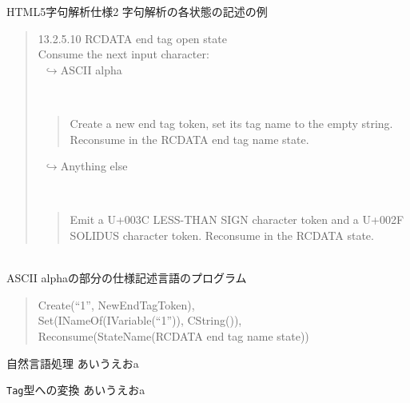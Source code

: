 \documentclass[dvipdfmx]{beamer}
\begin{document}
\begin{frame}{HTML5字句解析仕様2}
字句解析の各状態の記述の例 \\
   
\begin{quote}
   13.2.5.10 RCDATA end tag open state\\
   Consume the next input character:\\
   $\ \ \hookrightarrow$ASCII alpha

   \ 
   \begin{quote}
      Create a new end tag token, set its tag name to the empty string. 
      Reconsume in the RCDATA end tag name state. 
   \end{quote}
   $\ \ \hookrightarrow $Anything else

   \ 
   \begin{quote}
      Emit a U+003C LESS-THAN SIGN character token and a U+002F SOLIDUS character token. 
      Reconsume in the RCDATA state.
   \end{quote}
\end{quote}
　\\

ASCII alphaの部分の仕様記述言語のプログラム\\

\begin{quote}
   Create(``1'', NewEndTagToken), \\
   Set(INameOf(IVariable(``1'')), CString()), \\
   Reconsume(StateName(RCDATA end tag name state)) 
\end{quote}
\end{frame}

\begin{frame}{自然言語処理}
   あいうえおa
\end{frame}

\begin{frame}{\texttt{Tag}型への変換}
   あいうえおa
\end{frame}
\end{document}
